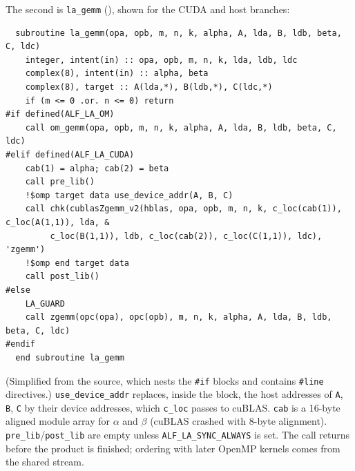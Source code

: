 The second is \texttt{la\_gemm} (), shown for the CUDA and host branches:
\begin{lstlisting}
  subroutine la_gemm(opa, opb, m, n, k, alpha, A, lda, B, ldb, beta, C, ldc)
    integer, intent(in) :: opa, opb, m, n, k, lda, ldb, ldc
    complex(8), intent(in) :: alpha, beta
    complex(8), target :: A(lda,*), B(ldb,*), C(ldc,*)
    if (m <= 0 .or. n <= 0) return
#if defined(ALF_LA_OM)
    call om_gemm(opa, opb, m, n, k, alpha, A, lda, B, ldb, beta, C, ldc)
#elif defined(ALF_LA_CUDA)
    cab(1) = alpha; cab(2) = beta
    call pre_lib()
    !$omp target data use_device_addr(A, B, C)
    call chk(cublasZgemm_v2(hblas, opa, opb, m, n, k, c_loc(cab(1)), c_loc(A(1,1)), lda, &
         c_loc(B(1,1)), ldb, c_loc(cab(2)), c_loc(C(1,1)), ldc), 'zgemm')
    !$omp end target data
    call post_lib()
#else
    LA_GUARD
    call zgemm(opc(opa), opc(opb), m, n, k, alpha, A, lda, B, ldb, beta, C, ldc)
#endif
  end subroutine la_gemm
\end{lstlisting}
(Simplified from the source, which nests the \texttt{\#if} blocks and contains \texttt{\#line} directives.) \texttt{use\_device\_addr} replaces, inside the block, the host addresses of \texttt{A}, \texttt{B}, \texttt{C} by their device addresses, which \texttt{c\_loc} passes to cuBLAS. \texttt{cab} is a 16-byte aligned module array for $\alpha$ and $\beta$ (cuBLAS crashed with 8-byte alignment). \texttt{pre\_lib}/\texttt{post\_lib} are empty unless \texttt{ALF\_LA\_SYNC\_ALWAYS} is set. The call returns before the product is finished; ordering with later OpenMP kernels comes from the shared stream.
